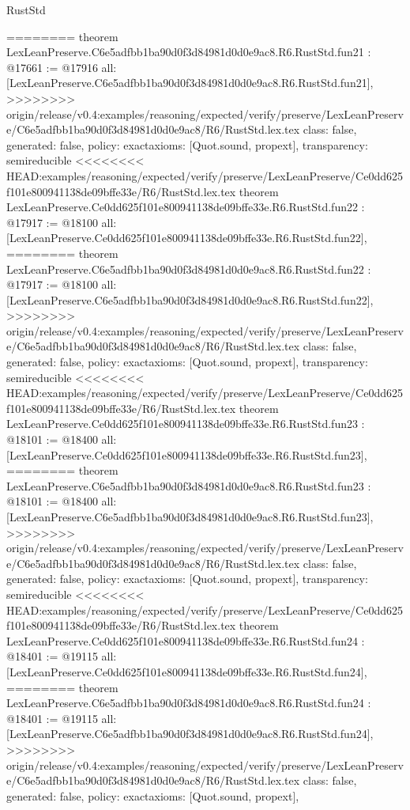 \begin{lexlean}{RustStd}
\begin{coremodule}
{\begin{coremodule}
{{{{{{{{{{{{{{{{{{{{{{{{========
theorem LexLeanPreserve.C6e5adfbb1ba90d0f3d84981d0d0e9ac8.R6.RustStd.fun21 : @17661 := @17916 {
  all: [LexLeanPreserve.C6e5adfbb1ba90d0f3d84981d0d0e9ac8.R6.RustStd.fun21],
>>>>>>>> origin/release/v0.4:examples/reasoning/expected/verify/preserve/LexLeanPreserve/C6e5adfbb1ba90d0f3d84981d0d0e9ac8/R6/RustStd.lex.tex
  class: false,
  generated: false,
  policy: exact{axioms: [Quot.sound, propext]},
  transparency: semireducible
}
<<<<<<<< HEAD:examples/reasoning/expected/verify/preserve/LexLeanPreserve/Ce0dd625f101e800941138de09bffe33e/R6/RustStd.lex.tex
theorem LexLeanPreserve.Ce0dd625f101e800941138de09bffe33e.R6.RustStd.fun22 : @17917 := @18100 {
  all: [LexLeanPreserve.Ce0dd625f101e800941138de09bffe33e.R6.RustStd.fun22],
========
theorem LexLeanPreserve.C6e5adfbb1ba90d0f3d84981d0d0e9ac8.R6.RustStd.fun22 : @17917 := @18100 {
  all: [LexLeanPreserve.C6e5adfbb1ba90d0f3d84981d0d0e9ac8.R6.RustStd.fun22],
>>>>>>>> origin/release/v0.4:examples/reasoning/expected/verify/preserve/LexLeanPreserve/C6e5adfbb1ba90d0f3d84981d0d0e9ac8/R6/RustStd.lex.tex
  class: false,
  generated: false,
  policy: exact{axioms: [Quot.sound, propext]},
  transparency: semireducible
}
<<<<<<<< HEAD:examples/reasoning/expected/verify/preserve/LexLeanPreserve/Ce0dd625f101e800941138de09bffe33e/R6/RustStd.lex.tex
theorem LexLeanPreserve.Ce0dd625f101e800941138de09bffe33e.R6.RustStd.fun23 : @18101 := @18400 {
  all: [LexLeanPreserve.Ce0dd625f101e800941138de09bffe33e.R6.RustStd.fun23],
========
theorem LexLeanPreserve.C6e5adfbb1ba90d0f3d84981d0d0e9ac8.R6.RustStd.fun23 : @18101 := @18400 {
  all: [LexLeanPreserve.C6e5adfbb1ba90d0f3d84981d0d0e9ac8.R6.RustStd.fun23],
>>>>>>>> origin/release/v0.4:examples/reasoning/expected/verify/preserve/LexLeanPreserve/C6e5adfbb1ba90d0f3d84981d0d0e9ac8/R6/RustStd.lex.tex
  class: false,
  generated: false,
  policy: exact{axioms: [Quot.sound, propext]},
  transparency: semireducible
}
<<<<<<<< HEAD:examples/reasoning/expected/verify/preserve/LexLeanPreserve/Ce0dd625f101e800941138de09bffe33e/R6/RustStd.lex.tex
theorem LexLeanPreserve.Ce0dd625f101e800941138de09bffe33e.R6.RustStd.fun24 : @18401 := @19115 {
  all: [LexLeanPreserve.Ce0dd625f101e800941138de09bffe33e.R6.RustStd.fun24],
========
theorem LexLeanPreserve.C6e5adfbb1ba90d0f3d84981d0d0e9ac8.R6.RustStd.fun24 : @18401 := @19115 {
  all: [LexLeanPreserve.C6e5adfbb1ba90d0f3d84981d0d0e9ac8.R6.RustStd.fun24],
>>>>>>>> origin/release/v0.4:examples/reasoning/expected/verify/preserve/LexLeanPreserve/C6e5adfbb1ba90d0f3d84981d0d0e9ac8/R6/RustStd.lex.tex
  class: false,
  generated: false,
  policy: exact{axioms: [Quot.sound, propext]},
}}}}}}}}}}}}}}}}}}}}}}}}}}}}
\end{coremodule}}
\end{coremodule}
\end{lexlean}
